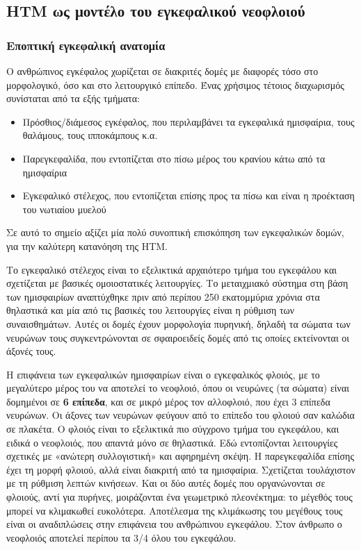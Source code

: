 \subsection{HTM ως μοντέλο του εγκεφαλικού νεοφλοιού}

\subsubsection{Εποπτική εγκεφαλική ανατομία} \label{intro:brain_anatomy}

  Ο ανθρώπινος εγκέφαλος χωρίζεται σε διακριτές δομές με διαφορές τόσο στο μορφολογικό, όσο και στο λειτουργικό επίπεδο.
  Ένας χρήσιμος τέτοιος διαχωρισμός συνίσταται από τα εξής τμήματα:
  \begin{itemize}
    \item Πρόσθιος/διάμεσος εγκέφαλος, που περιλαμβάνει τα εγκεφαλικά ημισφαίρια, τους θαλάμους, τους ιπποκάμπους κ.α.
    \item Παρεγκεφαλίδα, που εντοπίζεται στο πίσω μέρος του κρανίου κάτω από τα ημισφαίρια
    \item Εγκεφαλικό στέλεχος, που εντοπίζεται επίσης προς τα πίσω και είναι η προέκταση του νωτιαίου μυελού
  \end{itemize}

  Σε αυτό το σημείο αξίζει μία πολύ συνοπτική επισκόπηση των εγκεφαλικών δομών, για την καλύτερη κατανόηση της HTM.

  Το εγκεφαλικό στέλεχος είναι το εξελικτικά αρχαιότερο τμήμα του εγκεφάλου και σχετίζεται με βασικές ομοιοστατικές λειτουργίες.
  Το μεταιχμιακό σύστημα στη βάση των ημισφαιρίων αναπτύχθηκε πριν από περίπου 250 εκατομμύρια χρόνια στα θηλαστικά
  και μία από τις βασικές του λειτουργίες είναι η ρύθμιση των συναισθημάτων.
  Αυτές οι δομές έχουν μορφολογία πυρηνική, δηλαδή τα σώματα των νευρώνων τους συγκεντρώνονται σε σφαιροειδείς δομές
  από τις οποίες εκτείνονται οι άξονές τους.

  Η επιφάνεια των εγκεφαλικών ημισφαιρίων είναι ο εγκεφαλικός φλοιός, με το μεγαλύτερο μέρος του να αποτελεί το νεοφλοιό,
  όπου οι νευρώνες (τα σώματα) είναι δομημένοι σε \textbf{6 επίπεδα}, και σε μικρό μέρος τον αλλοφλοιό, που έχει 3 επίπεδα νευρώνων.
  Οι άξονες των νευρώνων φεύγουν από το επίπεδο του φλοιού σαν καλώδια σε πλακέτα.
  Ο φλοιός είναι το εξελικτικά πιο σύγχρονο τμήμα του εγκεφάλου, και ειδικά ο νεοφλοιός, που απαντά μόνο σε θηλαστικά.
  Εδώ εντοπίζονται λειτουργίες σχετικές με «ανώτερη συλλογιστική» και αφηρημένη σκέψη.
  Η παρεγκεφαλίδα επίσης έχει τη μορφή φλοιού, αλλά είναι διακριτή από τα ημισφαίρια. Σχετίζεται τουλάχιστον με τη
  ρύθμιση λεπτών κινήσεων. Και οι δύο αυτές δομές που οργανώνονται σε φλοιούς, αντί για πυρήνες, μοιράζονται ένα
  γεωμετρικό πλεονέκτημα: το μέγεθός τους μπορεί να κλιμακωθεί ευκολότερα.
  Αποτέλεσμα της κλιμάκωσης του μεγέθους τους είναι οι αναδιπλώσεις στην επιφάνεια του ανθρώπινου εγκεφάλου.
  Στον άνθρωπο ο νεοφλοιός αποτελεί περίπου τα 3/4 όλου του εγκεφάλου.

